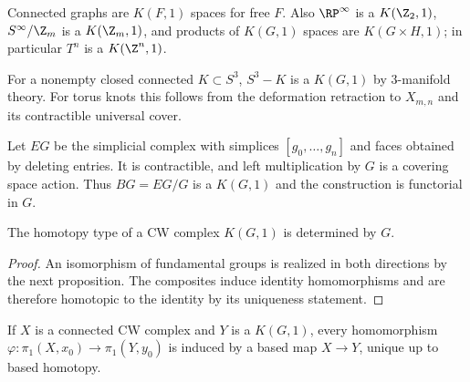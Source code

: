 \begin{example}
\label{ex:graphs-are-kg1}
Connected graphs are $K(F,1)$ spaces for free $F$. Also $\RP^\infty$ is a
$K(\Z_2,1)$, $S^\infty/\Z_m$ is a $K(\Z_m,1)$, and products of $K(G,1)$
spaces are $K(G\times H,1)$; in particular $T^n$ is a $K(\Z^n,1)$.
\end{example}

\begin{example}
\label{ex:knot-complement-in-s3-kg1}
For a nonempty closed connected $K\subset S^3$, $S^3-K$ is a $K(G,1)$ by
3-manifold theory. For torus knots this follows from the deformation
retraction to $X_{m,n}$ and its contractible universal cover.
\end{example}

\begin{example}
\label{ex:milnor-construction-eg-bg}
Let $EG$ be the simplicial complex with simplices $[g_0,\ldots,g_n]$ and
faces obtained by deleting entries. It is contractible, and left multiplication
by $G$ is a covering space action. Thus $BG=EG/G$ is a $K(G,1)$ and the
construction is functorial in $G$.
\end{example}

\begin{theorem}
\label{thm:kg1-unique-homotopy-type}
The homotopy type of a CW complex $K(G,1)$ is determined by $G$.
\end{theorem}

\begin{proof}
\sketch An isomorphism of fundamental groups is realized in both directions by
the next proposition. The composites induce identity homomorphisms and are
therefore homotopic to the identity by its uniqueness statement.
\end{proof}

\begin{proposition}
\label{prop:homomorphism-to-kg1-realized-by-map}
If $X$ is a connected CW complex and $Y$ is a $K(G,1)$, every homomorphism
$\varphi:\pi_1(X,x_0)\to\pi_1(Y,y_0)$ is induced by a based map $X\to Y$,
unique up to based homotopy.
\end{proposition}

